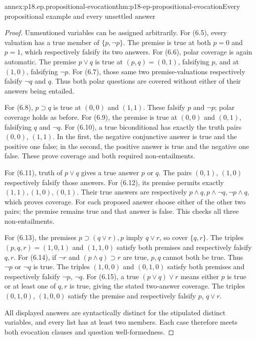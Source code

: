 \begin{annexitem}{annex:p18.ep.propositional-evocation}{thm:p18-ep-propositional-evocation}{Every propositional example and every unsettled answer}
\begin{proof}
Unmentioned variables can be assigned arbitrarily. For (6.5), every valuation
has a true member of \(\{p,\neg p\}\). The premise is true at both
\(p=0\) and \(p=1\), which respectively falsify its two answers.
For (6.6), polar coverage is again automatic. The premise \(p\lor q\)
is true at \((p,q)=(0,1)\), falsifying \(p\), and at \((1,0)\),
falsifying \(\neg p\). For (6.7), those same two premise-valuations
respectively falsify \(\neg q\) and \(q\). Thus both polar questions
are covered without either of their answers being entailed.

For (6.8), \(p\supset q\) is true at \((0,0)\) and \((1,1)\).
These falsify \(p\) and \(\neg p\); polar coverage holds as before.
For (6.9), the premise is true at \((0,0)\) and \((0,1)\), falsifying
\(q\) and \(\neg q\). For (6.10), a true biconditional has exactly
the truth pairs \((0,0)\), \((1,1)\). In the first, the negative
conjunctive answer is true and the positive one false; in the second,
the positive answer is true and the negative one false. These prove
coverage and both required non-entailments.

For (6.11), truth of \(p\lor q\) gives a true answer \(p\) or \(q\).
The pairs \((0,1)\), \((1,0)\) respectively falsify those answers.
For (6.12), its premise permits exactly \((1,1),(1,0),(0,1)\). Their
true answers are respectively \(p\land q,p\land\neg q,\neg p\land q\),
which proves coverage. For each proposed answer choose either of the
other two pairs; the premise remains true and that answer is false.
This checks all three non-entailments.

For (6.13), the premises \(p\supset(q\lor r),p\) imply \(q\lor r\),
so cover \(\{q,r\}\). The triples \((p,q,r)=(1,0,1)\) and
\((1,1,0)\) satisfy both premises and respectively falsify \(q,r\).
For (6.14), if \(\neg r\) and \((p\land q)\supset r\) are true,
\(p,q\) cannot both be true. Thus \(\neg p\) or \(\neg q\) is true.
The triples \((1,0,0)\) and \((0,1,0)\) satisfy both premises and
respectively falsify \(\neg p\), \(\neg q\).
For (6.15), a true \((p\lor q)\lor r\) means either \(p\) is true
or at least one of \(q,r\) is true, giving the stated two-answer coverage.
The triples \((0,1,0)\), \((1,0,0)\) satisfy the premise and respectively
falsify \(p\), \(q\lor r\).

All displayed answers are syntactically distinct for the stipulated distinct
variables, and every list has at least two members. Each case therefore
meets both evocation clauses and question well-formedness.
\end{proof}
\end{annexitem}

